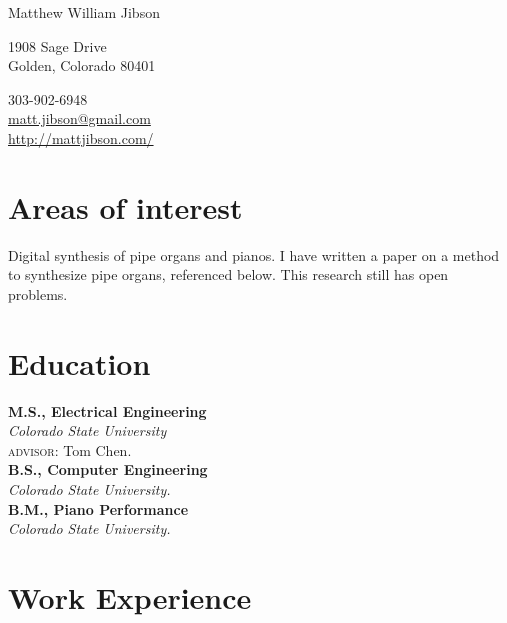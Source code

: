 \documentclass[10pt, a4paper]{article}
\newcommand{\years}[1]{\marginnote{\footnotesize #1}}
\begin{document}
\sloppy

\reversemarginpar
{{\huge Matthew William Jibson}\\[1.0cm]
\parbox{.5\linewidth}{
\vspace{\baselineskip}
1908 Sage Drive\\
Golden, Colorado 80401
}
\parbox{.5\linewidth}{
\begin{flushright}
303-902-6948\\
\href{mailto:matt.jibson@gmail.com}{matt.jibson@gmail.com}\\
\href{http://mattjibson.com/}{http://mattjibson.com/}\\
\end{flushright}
}

\section*{Areas of interest}
Digital synthesis of pipe organs and pianos. I have written a paper on a method to synthesize pipe organs, referenced below. This research still has open problems.

\section*{Education}

\noindent\years{2009}\textbf{M.S., Electrical Engineering}\\
\emph{Colorado State University} \\
{\small \textsc{advisor:} Tom Chen.}\\[.2cm]
\years{2007}\textbf{B.S., Computer Engineering}\\
\emph{Colorado State University.}\\[.2cm]
\years{2007}\textbf{B.M., Piano Performance}\\
\emph{Colorado State University.}

\section*{Work Experience}

}
\end{document}
